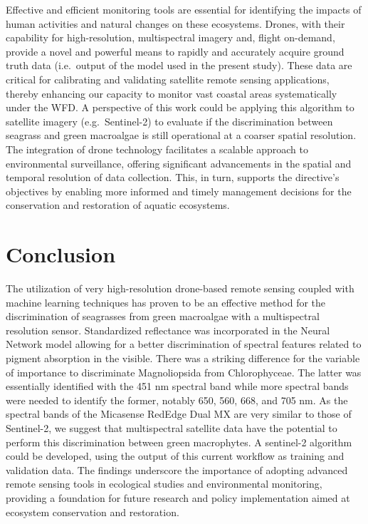 \documentclass[
  number]{elsarticle}
\begin{document}
Effective and efficient monitoring tools are essential for identifying
the impacts of human activities and natural changes on these ecosystems.
Drones, with their capability for high-resolution, multispectral imagery
and, flight on-demand, provide a novel and powerful means to rapidly and
accurately acquire ground truth data (i.e.~output of the model used in
the present study). These data are critical for calibrating and
validating satellite remote sensing applications, thereby enhancing our
capacity to monitor vast coastal areas systematically under the WFD. A
perspective of this work could be applying this algorithm to satellite
imagery (e.g.~Sentinel-2) to evaluate if the discrimination between
seagrass and green macroalgae is still operational at a coarser spatial
resolution. The integration of drone technology facilitates a scalable
approach to environmental surveillance, offering significant
advancements in the spatial and temporal resolution of data collection.
This, in turn, supports the directive's objectives by enabling more
informed and timely management decisions for the conservation and
restoration of aquatic ecosystems.

\section{Conclusion}\label{conclusion}

The utilization of very high-resolution drone-based remote sensing
coupled with machine learning techniques has proven to be an effective
method for the discrimination of seagrasses from green macroalgae with a
multispectral resolution sensor. Standardized reflectance was
incorporated in the Neural Network model allowing for a better
discrimination of spectral features related to pigment absorption in the
visible. There was a striking difference for the variable of importance
to discriminate Magnoliopsida from Chlorophyceae. The latter was
essentially identified with the 451 nm spectral band while more spectral
bands were needed to identify the former, notably 650, 560, 668, and 705
nm. As the spectral bands of the Micasense RedEdge Dual MX are very
similar to those of Sentinel-2, we suggest that multispectral satellite
data have the potential to perform this discrimination between green
macrophytes. A sentinel-2 algorithm could be developed, using the output
of this current workflow as training and validation data. The findings
underscore the importance of adopting advanced remote sensing tools in
ecological studies and environmental monitoring, providing a foundation
for future research and policy implementation aimed at ecosystem
conservation and restoration.


  
\end{document}
